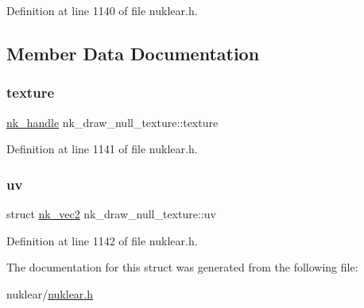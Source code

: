 Definition at line 1140 of file nuklear.\+h.



\subsection{Member Data Documentation}
\mbox{\label{structnk__draw__null__texture_a28406c59e642297560123c8f927dbf44}} 
\subsubsection{\texorpdfstring{texture}{texture}}
{\footnotesize\ttfamily \mbox{\hyperlink{unionnk__handle}{nk\+\_\+handle}} nk\+\_\+draw\+\_\+null\+\_\+texture\+::texture}



Definition at line 1141 of file nuklear.\+h.

\mbox{\label{structnk__draw__null__texture_ae00f89beb79ed9aa53d2ddcbdd1ea7c7}} 
\subsubsection{\texorpdfstring{uv}{uv}}
{\footnotesize\ttfamily struct \mbox{\hyperlink{structnk__vec2}{nk\+\_\+vec2}} nk\+\_\+draw\+\_\+null\+\_\+texture\+::uv}



Definition at line 1142 of file nuklear.\+h.



The documentation for this struct was generated from the following file\+:\begin{DoxyCompactItemize}
\item 
nuklear/\mbox{\hyperlink{nuklear_8h}{nuklear.\+h}}\end{DoxyCompactItemize}
